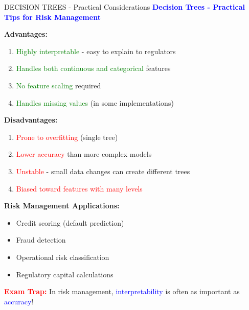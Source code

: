 \documentclass[8pt]{beamer}
\begin{document}
	\begin{frame}{DECISION TREES - Practical Considerations}
		\fontsize{6.5}{7.5}\selectfont
		\textcolor{blue}{\textbf{Decision Trees - Practical Tips for Risk Management}}
		
		\textbf{Advantages:}
		\begin{enumerate}
			\item \textcolor{green}{Highly interpretable} - easy to explain to regulators
			\item \textcolor{green}{Handles both continuous and categorical} features
			\item \textcolor{green}{No feature scaling} required
			\item \textcolor{green}{Handles missing values} (in some implementations)
		\end{enumerate}
		
		\textbf{Disadvantages:}
		\begin{enumerate}
			\item \textcolor{red}{Prone to overfitting} (single tree)
			\item \textcolor{red}{Lower accuracy} than more complex models
			\item \textcolor{red}{Unstable} - small data changes can create different trees
			\item \textcolor{red}{Biased toward features with many levels}
		\end{enumerate}
		
		\textbf{Risk Management Applications:}
		\begin{itemize}
			\item Credit scoring (default prediction)
			\item Fraud detection
			\item Operational risk classification
			\item Regulatory capital calculations
		\end{itemize}
		
		\textcolor{red}{\textbf{Exam Trap:}} In risk management, \textcolor{blue}{interpretability} is often as important as \textcolor{blue}{accuracy}!
	\end{frame}
	
	
\end{document}
